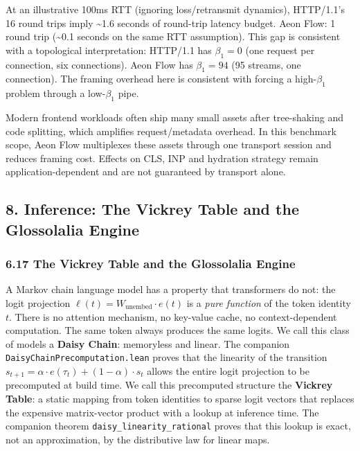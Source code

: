 \documentclass[
  11pt,
]{article}
\begin{document}
At an illustrative 100ms RTT (ignoring loss/retransmit dynamics),
HTTP/1.1's 16 round trips imply \textasciitilde1.6 seconds of round-trip
latency budget. Aeon Flow: 1 round trip (\textasciitilde0.1 seconds on
the same RTT assumption). This gap is consistent with a topological
interpretation: HTTP/1.1 has \(\beta_1 = 0\) (one request per
connection, six connections). Aeon Flow has \(\beta_1 = 94\) (95
streams, one connection). The framing overhead here is consistent with
forcing a high-\(\beta_1\) problem through a low-\(\beta_1\) pipe.

Modern frontend workloads often ship many small assets after
tree-shaking and code splitting, which amplifies request/metadata
overhead. In this benchmark scope, Aeon Flow multiplexes these assets
through one transport session and reduces framing cost. Effects on CLS,
INP and hydration strategy remain application-dependent and are not
guaranteed by transport alone.

\subsection{8. Inference: The Vickrey Table and the Glossolalia
Engine}\label{inference-the-vickrey-table-and-the-glossolalia-engine}

\subsubsection{6.17 The Vickrey Table and the Glossolalia
Engine}\label{the-vickrey-table-and-the-glossolalia-engine}

A Markov chain language model has a property that transformers do not:
the logit projection \(\ell(t) = W_{\text{unembed}} \cdot e(t)\) is a
\emph{pure function} of the token identity \(t\). There is no attention
mechanism, no key-value cache, no context-dependent computation. The
same token always produces the same logits. We call this class of models
a \textbf{Daisy Chain}: memoryless and linear. The companion
\texttt{DaisyChainPrecomputation.lean} proves that the linearity of the
transition \(s_{t+1} = \alpha \cdot e(\tau_t) + (1-\alpha) \cdot s_t\)
allows the entire logit projection to be precomputed at build time. We
call this precomputed structure the \textbf{Vickrey Table}: a static
mapping from token identities to sparse logit vectors that replaces the
expensive matrix-vector product with a lookup at inference time. The
companion theorem \texttt{daisy\_linearity\_rational} proves that this
lookup is exact, not an approximation, by the distributive law for
linear maps.
\end{document}
